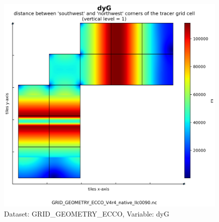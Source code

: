 \begin{figure}[H]
\centering
\includegraphics[scale=0.55]{../images/plots/native_plots_coords/Geometry_Parameters_for_the_Lat-Lon-Cap_90_(llc90)_Native_Model_Grid_(Version_4_Release_4)/dyG.png}
\caption{Dataset: GRID\_GEOMETRY\_ECCO, Variable: dyG}
\label{tab:table-GRID_GEOMETRY_ECCO_dyG-Plot}
\end{figure}
\newpage
\pagebreak
